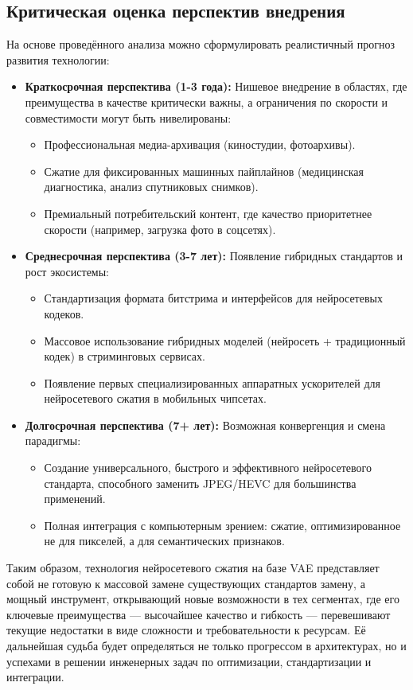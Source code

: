 \subsection{Критическая оценка перспектив внедрения}
На основе проведённого анализа можно сформулировать реалистичный прогноз развития технологии:

\begin{itemize}
\item \textbf{Краткосрочная перспектива (1-3 года):} Нишевое внедрение в областях, где преимущества в качестве критически важны, а ограничения по скорости и совместимости могут быть нивелированы:
\begin{itemize}
\item Профессиональная медиа-архивация (киностудии, фотоархивы).
\item Сжатие для фиксированных машинных пайплайнов (медицинская диагностика, анализ спутниковых снимков).
\item Премиальный потребительский контент, где качество приоритетнее скорости (например, загрузка фото в соцсетях).
\end{itemize}
\item \textbf{Среднесрочная перспектива (3-7 лет):} Появление гибридных стандартов и рост экосистемы:
\begin{itemize}
\item Стандартизация формата битстрима и интерфейсов для нейросетевых кодеков.
\item Массовое использование гибридных моделей (нейросеть + традиционный кодек) в стриминговых сервисах.
\item Появление первых специализированных аппаратных ускорителей для нейросетевого сжатия в мобильных чипсетах.
\end{itemize}
\item \textbf{Долгосрочная перспектива (7+ лет):} Возможная конвергенция и смена парадигмы:
\begin{itemize}
\item Создание универсального, быстрого и эффективного нейросетевого стандарта, способного заменить JPEG/HEVC для большинства применений.
\item Полная интеграция с компьютерным зрением: сжатие, оптимизированное не для пикселей, а для семантических признаков.
\end{itemize}
\end{itemize}

Таким образом, технология нейросетевого сжатия на базе VAE представляет собой не готовую к массовой замене существующих стандартов замену, а мощный инструмент, открывающий новые возможности в тех сегментах, где его ключевые преимущества — высочайшее качество и гибкость — перевешивают текущие недостатки в виде сложности и требовательности к ресурсам. Её дальнейшая судьба будет определяться не только прогрессом в архитектурах, но и успехами в решении инженерных задач по оптимизации, стандартизации и интеграции.